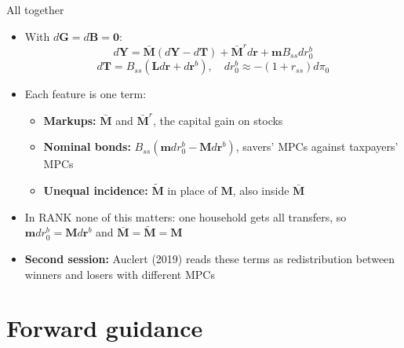 \documentclass[10pt,english]{beamer}
\begin{document}
\begin{frame}{All together}
\vspace{-1mm}
\begin{itemize}
\item <+->With $d\boldsymbol{G}=d\boldsymbol{B}=\boldsymbol{0}$:
\[
d\boldsymbol{Y}=\bar{\boldsymbol{M}}\left(d\boldsymbol{Y}-d\boldsymbol{T}\right)+\bar{\boldsymbol{M}}^{r}d\boldsymbol{r}+\boldsymbol{m}B_{ss}dr_{0}^{b}
\]
\[
d\boldsymbol{T}=B_{ss}\left(\boldsymbol{L}d\boldsymbol{r}+d\boldsymbol{r}^{b}\right),\quad dr_{0}^{b}\approx-(1+r_{ss})d\pi_{0}
\]
\item <+->Each feature is one term:
\begin{itemize}
\item \textbf{Markups:} $\bar{\boldsymbol{M}}$ and $\bar{\boldsymbol{M}}^{r}$, the capital gain on stocks
\item \textbf{Nominal bonds:} $B_{ss}\left(\boldsymbol{m}dr_{0}^{b}-\boldsymbol{M}d\boldsymbol{r}^{b}\right)$, savers' MPCs against taxpayers' MPCs
\item \textbf{Unequal incidence:} $\tilde{\boldsymbol{M}}$ in place of $\boldsymbol{M}$, also inside $\bar{\boldsymbol{M}}$
\end{itemize}
\item <+->In RANK none of this matters: one household gets all transfers, so $\boldsymbol{m}dr_{0}^{b}=\boldsymbol{M}d\boldsymbol{r}^{b}$ and $\bar{\boldsymbol{M}}=\tilde{\boldsymbol{M}}=\boldsymbol{M}$
\item <+->\textbf{Second session:} Auclert (2019) reads these terms as redistribution between winners and losers with different MPCs
\end{itemize}
\end{frame}
%

\section{Forward guidance}
\end{document}
